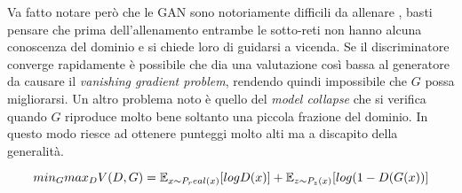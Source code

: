 Va fatto notare però che le GAN sono notoriamente difficili da allenare %
, basti pensare che prima dell'allenamento entrambe le sotto-reti non hanno alcuna conoscenza del dominio e si chiede loro di guidarsi a vicenda.
Se il discriminatore converge rapidamente è possibile che dia una valutazione così bassa al generatore da causare il \emph{vanishing gradient problem}, rendendo quindi impossibile che $G$ possa migliorarsi.
Un altro problema noto è quello del \emph{model collapse} che si verifica quando $G$ riproduce molto bene soltanto una piccola frazione del dominio.
In questo modo riesce ad ottenere punteggi molto alti ma a discapito della generalità.





$$
min_G max_D V(D,G) = \mathbb{E}_{x \sim P_real(x)} [ log D(x) ] 
+
\mathbb{E}_{z \sim P_z(x)} [ log ( 1 - D(G(x)) ]
$$ 

